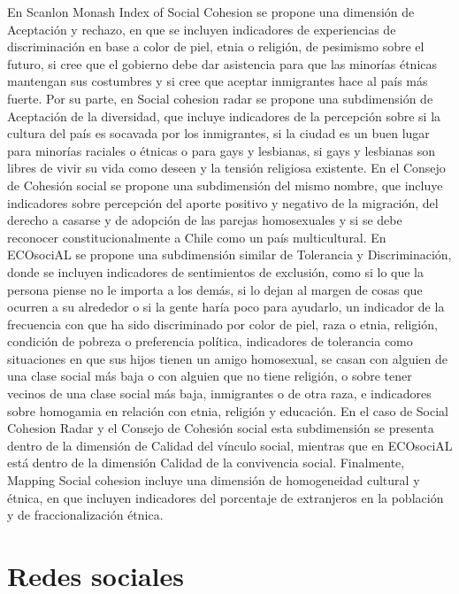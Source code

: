\documentclass[
  12pt,
]{book}
\begin{document}
En Scanlon Monash Index of Social Cohesion se propone una dimensión de Aceptación y rechazo, en que se incluyen indicadores de experiencias de discriminación en base a color de piel, etnia o religión, de pesimismo sobre el futuro, si cree que el gobierno debe dar asistencia para que las minorías étnicas mantengan sus costumbres y si cree que aceptar inmigrantes hace al país más fuerte. Por su parte, en Social cohesion radar se propone una subdimensión de Aceptación de la diversidad, que incluye indicadores de la percepción sobre si la cultura del país es socavada por los inmigrantes, si la ciudad es un buen lugar para minorías raciales o étnicas o para gays y lesbianas, si gays y lesbianas son libres de vivir su vida como deseen y la tensión religiosa existente. En el Consejo de Cohesión social se propone una subdimensión del mismo nombre, que incluye indicadores sobre percepción del aporte positivo y negativo de la migración, del derecho a casarse y de adopción de las parejas homosexuales y si se debe reconocer constitucionalmente a Chile como un país multicultural. En ECOsociAL se propone una subdimensión similar de Tolerancia y Discriminación, donde se incluyen indicadores de sentimientos de exclusión, como si lo que la persona piense no le importa a los demás, si lo dejan al margen de cosas que ocurren a su alrededor o si la gente haría poco para ayudarlo, un indicador de la frecuencia con que ha sido discriminado por color de piel, raza o etnia, religión, condición de pobreza o preferencia política, indicadores de tolerancia como situaciones en que sus hijos tienen un amigo homosexual, se casan con alguien de una clase social más baja o con alguien que no tiene religión, o sobre tener vecinos de una clase social más baja, inmigrantes o de otra raza, e indicadores sobre homogamia en relación con etnia, religión y educación. En el caso de Social Cohesion Radar y el Consejo de Cohesión social esta subdimensión se presenta dentro de la dimensión de Calidad del vínculo social, mientras que en ECOsociAL está dentro de la dimensión Calidad de la convivencia social. Finalmente, Mapping Social cohesion incluye una dimensión de homogeneidad cultural y étnica, en que incluyen indicadores del porcentaje de extranjeros en la población y de fraccionalización étnica.

\hypertarget{redes-sociales}{%
\section{Redes sociales}\label{redes-sociales}}
\end{document}
